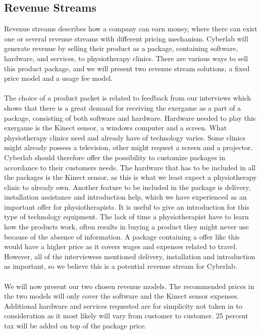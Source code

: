 \subsection{Revenue Streams}
Revenue streams describes how a company can earn money, where there can exist one or several revenue streams with different pricing mechanism. Cyberlab will generate revenue by selling their product as a package, containing software, hardware, and services, to physiotherapy clinics. There are various ways to sell this product package, and we will present two revenue stream solutions, a fixed price model and a usage fee model. \\ \\ 
The choice of a product packet is related to feedback from our interviews which shows that there is a great demand for receiving the exergame as a part of a package, consisting of both software and hardware. Hardware needed to play this exergame is the Kinect sensor, a windows computer and a screen. What physiotherapy clinics need and already have of technology varies. Some clinics might already possess a television, other might request a screen and a projector. Cyberlab should therefore offer the possibility to customize packages in accordance to their customers needs. The hardware that has to be included in all the packages is the Kinect sensor, as this is what we least expect a physiotherapy clinic to already own. Another feature to be included in the package is delivery, installation assistance and introduction help, which we have experienced as an important offer for physiotherapists. It is useful to give an introduction for this type of technology equipment. The lack of time a physiotherapist have to learn how the products work, often results in buying a product they might never use because of the absence of information. A package containing a offer like this would have a higher price as it covers wages and expenses related to travel. However, all of the interviewees mentioned delivery, installation and introduction as important, so we believe this is a potential revenue stream for Cyberlab. \\ \\ 
We will now present our two chosen revenue models. The recommended prices in the two models will only cover the software and the Kinect sensor expenses. Additional hardware and services requested are for simplicity not taken in to consideration as it most likely will vary from customer to customer. 25 percent tax will be added on top of the package price. \\ \\
